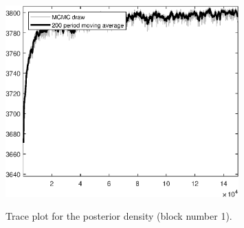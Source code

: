 \begin{figure}[H]
\centering
  \includegraphics[width=0.8\textwidth]{BRS_sectoral_KK/graphs/TracePlot_Posterior_blck_1}\\
    \caption{Trace plot for the posterior density (block number 1).}
\end{figure}

